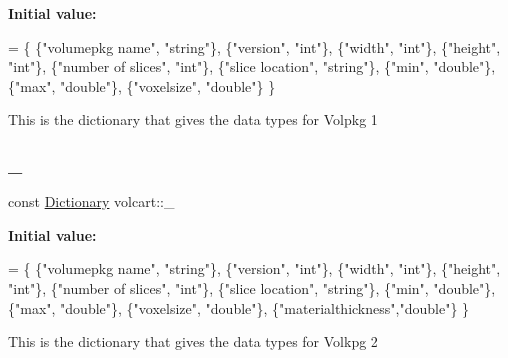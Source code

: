 {\bfseries Initial value\+:}
\begin{DoxyCode}
=
        \{
        \{\textcolor{stringliteral}{"volumepkg name"},   \textcolor{stringliteral}{"string"}\},
        \{\textcolor{stringliteral}{"version"},          \textcolor{stringliteral}{"int"}\},
        \{\textcolor{stringliteral}{"width"},            \textcolor{stringliteral}{"int"}\},
        \{\textcolor{stringliteral}{"height"},           \textcolor{stringliteral}{"int"}\},
        \{\textcolor{stringliteral}{"number of slices"}, \textcolor{stringliteral}{"int"}\},
        \{\textcolor{stringliteral}{"slice location"},   \textcolor{stringliteral}{"string"}\},
        \{\textcolor{stringliteral}{"min"},              \textcolor{stringliteral}{"double"}\},
        \{\textcolor{stringliteral}{"max"},              \textcolor{stringliteral}{"double"}\},
        \{\textcolor{stringliteral}{"voxelsize"},        \textcolor{stringliteral}{"double"}\}
        \}
\end{DoxyCode}
This is the dictionary that gives the data types for Volpkg 1 \hypertarget{namespacevolcart_aa72ffe0fec32eedd0bba8af24e731287}{}\label{namespacevolcart_aa72ffe0fec32eedd0bba8af24e731287} 
\subsubsection{\texorpdfstring{\+\_}{\_2}}
{\footnotesize\ttfamily const \hyperlink{namespacevolcart_aa4e334ff80b678b9556aee59618eb37a}{Dictionary} volcart\+::\+\_}

{\bfseries Initial value\+:}
\begin{DoxyCode}
=
        \{
        \{\textcolor{stringliteral}{"volumepkg name"},   \textcolor{stringliteral}{"string"}\},
        \{\textcolor{stringliteral}{"version"},          \textcolor{stringliteral}{"int"}\},
        \{\textcolor{stringliteral}{"width"},            \textcolor{stringliteral}{"int"}\},
        \{\textcolor{stringliteral}{"height"},           \textcolor{stringliteral}{"int"}\},
        \{\textcolor{stringliteral}{"number of slices"}, \textcolor{stringliteral}{"int"}\},
        \{\textcolor{stringliteral}{"slice location"},   \textcolor{stringliteral}{"string"}\},
        \{\textcolor{stringliteral}{"min"},              \textcolor{stringliteral}{"double"}\},
        \{\textcolor{stringliteral}{"max"},              \textcolor{stringliteral}{"double"}\},
        \{\textcolor{stringliteral}{"voxelsize"},        \textcolor{stringliteral}{"double"}\},
        \{\textcolor{stringliteral}{"materialthickness"},\textcolor{stringliteral}{"double"}\}
        \}
\end{DoxyCode}
This is the dictionary that gives the data types for Volkpg 2 \hypertarget{namespacevolcart_ab457f3dd0e44ebc4ef1ed01c7569938a}{}\label{namespacevolcart_ab457f3dd0e44ebc4ef1ed01c7569938a} 
